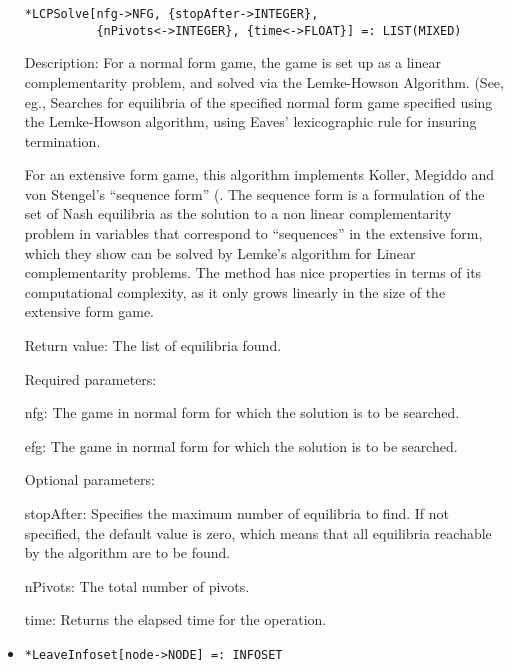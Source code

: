 \begin{itemize}
\protect \large \begin{verbatim}
*LCPSolve[nfg->NFG, {stopAfter->INTEGER},
          {nPivots<->INTEGER}, {time<->FLOAT}] =: LIST(MIXED)
\end{verbatim}\normalsize
\bd
\item
[Description:] For a normal form game, the game is set up as a linear
complementarity problem, and solved via the Lemke-Howson Algorithm.
(See, eg., Searches for equilibria of the specified normal form
game specified using the Lemke-Howson algorithm, 
\cite[1964]{LemHow:64} using Eaves' \cite[1971]{Eav:71}
lexicographic rule for insuring termination.  

For an extensive form game, this algorithm implements Koller, Megiddo
and von Stengel's ``sequence form'' (\cite[1994]{KolMegSte:94}. The
sequence form is a formulation of the set of Nash equilibria as the
solution to a non linear complementarity problem in variables that
correspond to ``sequences'' in the extensive form, which they show can
be solved by Lemke's algorithm for Linear complementarity problems.
The method has nice properties in terms of its computational
complexity, as it only grows linearly in the size of the extensive
form game.  

\item
[Return value:] The list of equilibria found.
\item
[Required parameters:]\hfil\null

\bd
\item
[nfg:] The game in normal form for which the solution is to be
searched.
\item
[efg:] The game in normal form for which the solution is to be
searched.
\ed

\item
[Optional parameters:]\hfil\null

\bd
\item
[stopAfter:] Specifies the maximum number of equilibria to find.  If
not specified, the default value is zero, which means that all
equilibria reachable by the algorithm are to be found.
\item
[nPivots:] The total number of pivots. 
\item
[time:] Returns the elapsed time for the operation.
\ed
\ed

\item
\protect \large \begin{verbatim}
*LeaveInfoset[node->NODE] =: INFOSET
\end{verbatim}\normalsize


\end{itemize}
